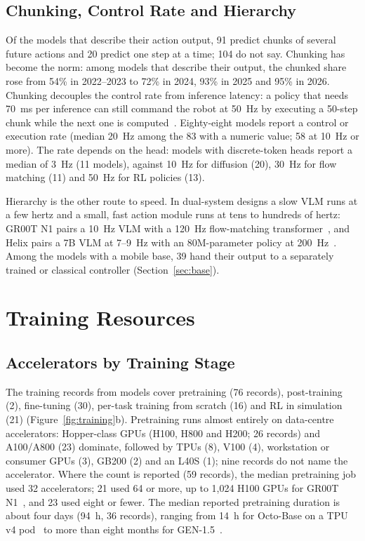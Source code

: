 \documentclass[applsci,review,submit,pdftex,oneauthor]{Definitions/mdpi}
\begin{document}
\subsection{Chunking, Control Rate and Hierarchy}

Of the models that describe their action output, 91 predict chunks of several future actions and 20 predict one step at a time; 104 do not say. Chunking has become the norm: among models that describe their output, the chunked share rose from 54\% in 2022--2023 to 72\% in 2024, 93\% in 2025 and 95\% in 2026. Chunking decouples the control rate from inference latency: a policy that needs 70~ms per inference can still command the robot at 50~Hz by executing a 50-step chunk while the next one is computed~\cite{ax230413705,ax241024164,ax250607339}. Eighty-eight models report a control or execution rate (median 20~Hz among the 83 with a numeric value; 58 at 10~Hz or more). The rate depends on the head: models with discrete-token heads report a median of 3~Hz (11 models), against 10~Hz for diffusion (20), 30~Hz for flow matching (11) and 50~Hz for RL policies (13).

Hierarchy is the other route to speed. In dual-system designs a slow VLM runs at a few hertz and a small, fast action module runs at tens to hundreds of hertz: GR00T N1 pairs a 10~Hz VLM with a 120~Hz flow-matching transformer~\cite{ax250314734}, and Helix pairs a 7B VLM at 7--9~Hz with an 80M-parameter policy at 200~Hz~\cite{web-figure-helix}. Among the \nMobile{} models with a mobile base, 39 hand their output to a separately trained or classical controller (Section~\ref{sec:base}).

\section{Training Resources}\label{sec:training}

\subsection{Accelerators by Training Stage}

The \nTGrecords{} training records from \nTGmodels{} models cover pretraining (76 records), post-training (2), fine-tuning (30), per-task training from scratch (16) and RL in simulation (21) (Figure~\ref{fig:training}b). Pretraining runs almost entirely on data-centre accelerators: Hopper-class GPUs (H100, H800 and H200; 26 records) and A100/A800 (23) dominate, followed by TPUs (8), V100 (4), workstation or consumer GPUs (3), GB200 (2) and an L40S (1); nine records do not name the accelerator. Where the count is reported (59 records), the median pretraining job used 32 accelerators; 21 used 64 or more, up to 1,024 H100 GPUs for GR00T N1~\cite{ax250314734}, and 23 used eight or fewer. The median reported pretraining duration is about four days (94~h, 36 records), ranging from 14~h for Octo-Base on a TPU v4 pod~\cite{ax240512213} to more than eight months for GEN-1.5~\cite{web-gen-1-5}.
\end{document}
